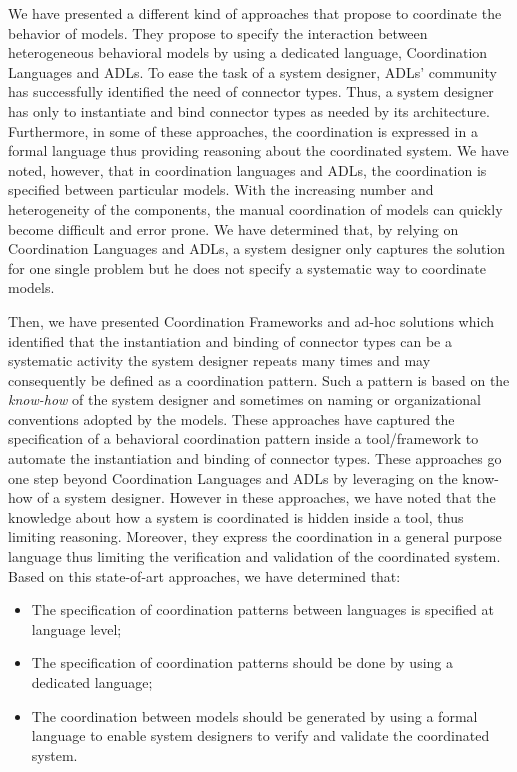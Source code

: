 We have presented a different kind of approaches that propose to coordinate the behavior of models. They propose to specify the interaction between heterogeneous behavioral models by using a dedicated language, \ie Coordination Languages and ADLs. To ease the task of a system designer, ADLs' community has successfully identified the need of connector types. Thus, a system designer has only to instantiate and bind connector types as needed by its architecture. Furthermore, in some of these approaches, the coordination is expressed in a formal language thus providing reasoning about the coordinated system. We have noted, however, that in coordination languages and ADLs, the coordination is specified between particular models. With the increasing number and heterogeneity of the components, the manual coordination of models can quickly become difficult and error prone. We have determined that, by relying on Coordination Languages and ADLs, a system designer only captures the solution for one single problem but he does not specify a systematic way to coordinate models. 
 
Then, we have presented Coordination Frameworks and ad-hoc solutions which identified that the instantiation and binding of connector types can be a systematic activity the system designer repeats many times and may consequently be defined as a coordination pattern. Such a pattern is based on the \emph{know-how} of the system designer and sometimes on naming or organizational conventions adopted by the models. These approaches have captured the specification of a behavioral coordination pattern inside a tool/framework to automate the instantiation and binding of connector types. These approaches go one step beyond Coordination Languages and ADLs by leveraging on the know-how of a system designer. However in these approaches, we have noted that the knowledge about how a system is coordinated is hidden inside a tool, thus limiting reasoning. Moreover, they express the coordination in a general purpose language thus limiting the verification and validation of the coordinated system. Based on this state-of-art approaches, we have determined that:

\begin{itemize}
\item The specification of coordination patterns between languages is specified at language level;
	 
\item The specification of coordination patterns should be done by using a dedicated language; 
	 
\item The coordination between models should be generated by using a formal language to enable system designers to verify and validate the coordinated system. 		
\end{itemize}


